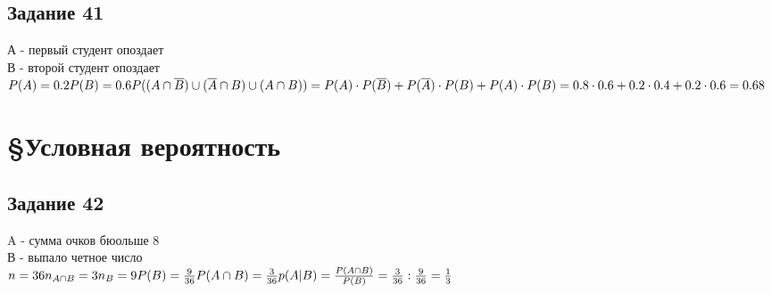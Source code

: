 \documentclass[12pt]{article}
\begin{document}
\newpage
\subsection{Задание 41}

А - первый студент опоздает\\
В - второй студент опоздает\\
$
P(A)=0.2\\
P(B)=0.6\\
P((A\cap \overline B)\cup 
(\overline A \cap B)\cup 
(A\cap B))=
P(A)\cdot P(\overline B)+
P(\overline A)\cdot P(B)+
P(A)\cdot P(B)=
0.8\cdot 0.6+0.2\cdot 0.4 + 0.2 \cdot 0.6=0.68
$

\newpage
\section{\S Условная вероятность}

\subsection{Задание 42}

A - сумма очков бюольше 8\\
В - выпало четное число\\
$
n=36\\
n_{A\cap B}=3\\
n_B=9\\
P(B)=\frac{9}{36}\\
P(A\cap B)=\frac{3}{36}\\
p(A|B)=\frac{P(A\cap B)}{P(B)}=\frac{3}{36} : \frac{9}{36}=\frac{1}{3}
$
\end{document}
